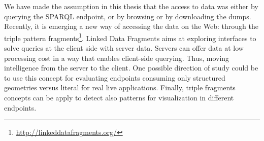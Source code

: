 We have made the assumption in this thesis that the access to data was either by  querying the SPARQL endpoint, or by browsing or by downloading the dumps. Recently, it is emerging a new way of accessing the data on the Web: through the triple pattern fragments\footnote{\url{http://linkeddatafragments.org/}}. Linked Data Fragments \cite{verborgh2014ldf} aims at exploring interfaces to 
solve queries at the client side with server data. 
Servers can offer data at low processing cost in a way that enables client-side querying. Thus, moving intelligence from the server to the client. One possible direction of study could be to use this concept for evaluating endpoints consuming only structured geometries versus literal for real live applications. Finally, triple fragments concepts can be apply to detect also patterns for visualization in different endpoints.
 

 